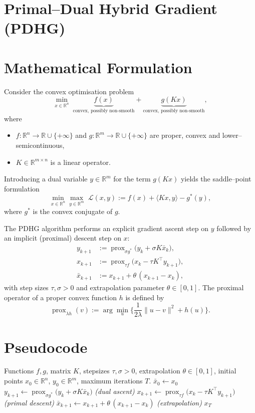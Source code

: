 \documentclass[11pt]{article}
\newcommand{\prox}{\operatorname{prox}}
\newcommand{\norm}[1]{\|#1\|}
\begin{document}
\section*{Primal–Dual Hybrid Gradient (PDHG)}

\section*{Mathematical Formulation}
Consider the convex optimisation problem
\[
\min_{x\in\mathbb{R}^n}\;  \underbrace{f(x)}_{\text{convex, possibly non‑smooth}}
      + \underbrace{g(Kx)}_{\text{convex, possibly non‑smooth}},
\tag{P}
\]
where 
\begin{itemize}
  \item $f:\mathbb{R}^n\to\mathbb{R}\cup\{+\infty\}$ and $g:\mathbb{R}^m\to\mathbb{R}\cup\{+\infty\}$ are proper, convex and lower–semicontinuous,
  \item $K\in\mathbb{R}^{m\times n}$ is a linear operator.
\end{itemize}
Introducing a dual variable $y\in\mathbb{R}^m$ for the term $g(Kx)$ yields the saddle–point formulation
\[
\min_{x\in\mathbb{R}^n}\max_{y\in\mathbb{R}^m}\;
\mathcal{L}(x,y):= f(x)+\langle Kx,y\rangle - g^{*}(y),
\tag{1}
\]
where $g^{*}$ is the convex conjugate of $g$.

The PDHG algorithm performs an explicit gradient ascent step on $y$ followed by an implicit (proximal) descent step on $x$:
\[
\boxed{
\begin{aligned}
y_{k+1} &:= \prox_{\sigma g^{*}}\bigl(y_k+\sigma K\bar{x}_k\bigr),\\[4pt]
x_{k+1} &:= \prox_{\tau f}\bigl(x_k-\tau K^{\!\top}y_{k+1}\bigr),\\[4pt]
\bar{x}_{k+1} &:= x_{k+1}+ \theta\,(x_{k+1}-x_k),
\end{aligned}}
\tag{2}
\]
with step sizes $\tau,\sigma>0$ and extrapolation parameter $\theta\in[0,1]$.  
The proximal operator of a proper convex function $h$ is defined by
\[
\prox_{\lambda h}(v):=\arg\min_{u}\Big\{\frac{1}{2\lambda}\norm{u-v}^{2}+h(u)\Big\}.
\tag{3}
\]

\section*{Pseudocode}
\begin{algorithm}[H]
\caption{Primal–Dual Hybrid Gradient (PDHG)}\label{alg:PDHG}
\begin{algorithmic}[1]
\REQUIRE Functions $f,g$, matrix $K$, stepsizes $\tau,\sigma>0$, extrapolation $\theta\in[0,1]$, initial points $x_0\in\mathbb{R}^n$, $y_0\in\mathbb{R}^m$, maximum iterations $T$.
\STATE $\bar{x}_0 \gets x_0$
    \STATE $y_{k+1}\gets \prox_{\sigma g^{*}}\!\bigl(y_k+\sigma K\bar{x}_k\bigr)$ \hfill\textit{(dual ascent)}
    \STATE $x_{k+1}\gets \prox_{\tau f}\!\bigl(x_k-\tau K^{\!\top}y_{k+1}\bigr)$ \hfill\textit{(primal descent)}
    \STATE $\bar{x}_{k+1}\gets x_{k+1}+ \theta\,(x_{k+1}-x_k)$ \hfill\textit{(extrapolation)}
\ENDFOR
\RETURN $x_T$
\end{algorithmic}
\end{algorithm}
\end{document}

